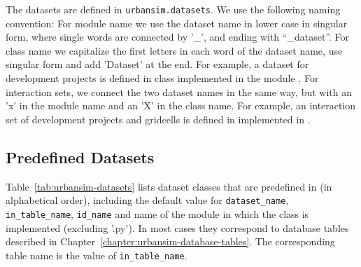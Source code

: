 The  datasets are defined in \verb|urbansim.datasets|. 
We use the following naming convention: For module name we use the dataset 
name in lower case in singular form, where single words are connected by
'_', and ending with ``_dataset''.
For class name we capitalize the first letters in each word of the dataset 
name, use singular form and add 'Dataset' at the end. For example, a dataset for
development projects is defined in class 
implemented in the module . For interaction
sets, we connect the two dataset names in the same way, but with 
an 'x' in the module name and an 'X' in the class name. For example, an
interaction set of development projects and gridcells is defined in
 implemented in
.

\subsection{Predefined Datasets}
 
%
Table~\ref{tab:urbansim-datasets} lists dataset classes that are predefined in
 (in alphabetical order), including the default value for
\verb|dataset_name|, \verb|in_table_name|, \verb|id_name| and name of the
module in which the class is implemented (excluding '.py'). In most cases they
correspond to database tables described in
Chapter~\ref{chapter:urbansim-database-tables}. The corresponding table name
is the value of \verb|in_table_name|.

